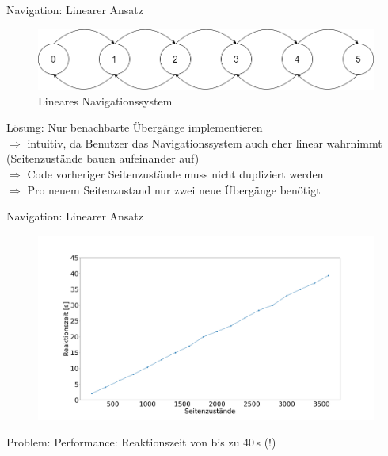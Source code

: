 \documentclass{beamer}
\begin{document}
\begin{frame}{Navigation: Linearer Ansatz}
\begin{figure}
\center
\begin{minipage}{\textwidth}
\includegraphics[width=\textwidth]{figures/navigationsystem-linear-overview.png}
\end{minipage}
\caption{Lineares Navigationssystem}
\end{figure}
Lösung: Nur benachbarte Übergänge implementieren\\
$\Rightarrow$ intuitiv, da Benutzer das Navigationssystem auch eher linear wahrnimmt (Seitenzustände bauen aufeinander auf)\\
$\Rightarrow$ Code vorheriger Seitenzustände muss nicht dupliziert werden\\
$\Rightarrow$ Pro neuem Seitenzustand nur zwei neue Übergänge benötigt
\end{frame}

\begin{frame}{Navigation: Linearer Ansatz}
\begin{figure}
\center
\begin{minipage}{\textwidth}
\includegraphics[width=\textwidth]{figures/performance_linear.png}
\end{minipage}
\end{figure}
Problem: Performance: Reaktionszeit von bis zu 40\,s (!)
\end{frame}
\end{document}
